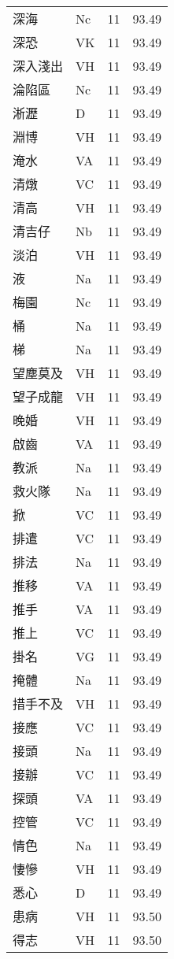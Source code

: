 \documentclass[twocolumn]{book}
\begin{document}
\begin{supertabular}{llrr}
深海 & Nc & 11 &  93.49\\
深恐 & VK & 11 &  93.49\\
深入淺出 & VH & 11 &  93.49\\
淪陷區 & Nc & 11 &  93.49\\
淅瀝 & D & 11 &  93.49\\
淵博 & VH & 11 &  93.49\\
淹水 & VA & 11 &  93.49\\
清燉 & VC & 11 &  93.49\\
清高 & VH & 11 &  93.49\\
清吉仔 & Nb & 11 &  93.49\\
淡泊 & VH & 11 &  93.49\\
液 & Na & 11 &  93.49\\
梅園 & Nc & 11 &  93.49\\
桶 & Na & 11 &  93.49\\
梯 & Na & 11 &  93.49\\
望塵莫及 & VH & 11 &  93.49\\
望子成龍 & VH & 11 &  93.49\\
晚婚 & VH & 11 &  93.49\\
啟齒 & VA & 11 &  93.49\\
教派 & Na & 11 &  93.49\\
救火隊 & Na & 11 &  93.49\\
掀 & VC & 11 &  93.49\\
排遣 & VC & 11 &  93.49\\
排法 & Na & 11 &  93.49\\
推移 & VA & 11 &  93.49\\
推手 & VA & 11 &  93.49\\
推上 & VC & 11 &  93.49\\
掛名 & VG & 11 &  93.49\\
掩體 & Na & 11 &  93.49\\
措手不及 & VH & 11 &  93.49\\
接應 & VC & 11 &  93.49\\
接頭 & Na & 11 &  93.49\\
接辦 & VC & 11 &  93.49\\
探頭 & VA & 11 &  93.49\\
控管 & VC & 11 &  93.49\\
情色 & Na & 11 &  93.49\\
悽慘 & VH & 11 &  93.49\\
悉心 & D & 11 &  93.49\\
患病 & VH & 11 &  93.50\\
得志 & VH & 11 &  93.50\\

\end{supertabular}
\end{document}
